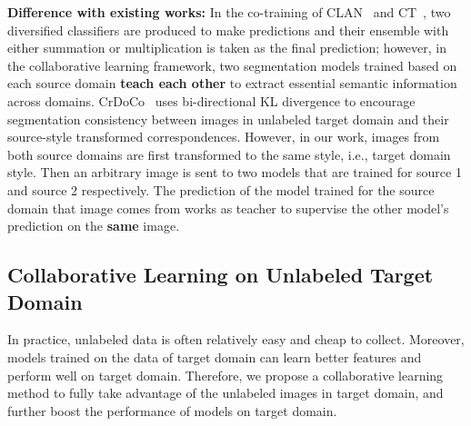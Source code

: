 \documentclass[final]{cvpr}
\begin{document}
\textbf{Difference with existing works:} In the co-training of CLAN~\cite{luo2019taking} and CT~\cite{qin2019generatively}, two diversified classifiers are produced to make predictions and their ensemble with either summation or multiplication is taken as the final prediction; however, in the collaborative learning framework, two segmentation models trained based on each source domain \textbf{teach each other} to extract essential semantic information across domains.
CrDoCo~\cite{chen2019crdoco} uses bi-directional KL divergence to encourage segmentation consistency between images in unlabeled target domain and their source-style transformed correspondences.  
However, in our work, images from both source domains are first transformed to the same style, i.e., target domain style. Then an arbitrary image is sent to two models that are trained for source 1 and source 2 respectively.  
The prediction of the model trained for the source domain that image comes from works as teacher to supervise the other model's prediction on the \textbf{same} image.

\subsection{Collaborative Learning on Unlabeled Target Domain}
In practice, unlabeled data is often relatively easy and cheap to collect. Moreover, models trained on the data of target domain can learn better features and perform well on target domain. Therefore, we propose a collaborative learning method to fully take advantage of the unlabeled images in target domain, and further boost the performance of models on target domain. 
\end{document}
